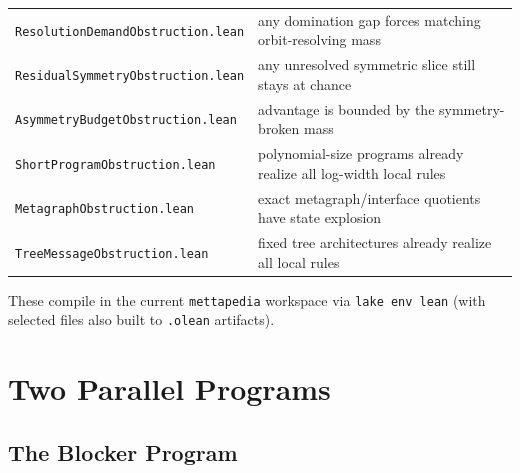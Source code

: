 \documentclass[11pt]{article}
\theoremstyle{remark}
\begin{document}
\begin{center}
\begin{tabular}{ll}
\texttt{ResolutionDemandObstruction.lean} & any domination gap forces matching orbit-resolving mass \\
\texttt{ResidualSymmetryObstruction.lean} & any unresolved symmetric slice still stays at chance \\
\texttt{AsymmetryBudgetObstruction.lean} & advantage is bounded by the symmetry-broken mass \\
\texttt{ShortProgramObstruction.lean} & polynomial-size programs already realize all log-width local rules \\
\texttt{MetagraphObstruction.lean} & exact metagraph/interface quotients have state explosion \\
\texttt{TreeMessageObstruction.lean} & fixed tree architectures already realize all local rules \\
\bottomrule
\end{tabular}
\end{center}

These compile in the current \texttt{mettapedia} workspace via \texttt{lake env lean}
(with selected files also built to \texttt{.olean} artifacts).

\section{Two Parallel Programs}

\subsection{The Blocker Program}
\end{document}
